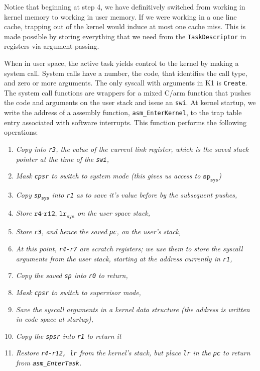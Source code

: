 \documentclass{article}
\begin{document}
Notice that beginning at step 4, we have definitively switched from working in
kernel memory to working in user memory. If we were working in a one line
cache, trapping out of the kernel would induce at most one cache miss. This is
made possible by storing everything that we need from the
\texttt{TaskDescriptor} in registers via argument passing.

When in user space, the active task yields control to the kernel by making a
system call. System calls have a number, the code, that identifies the call
type, and zero or more arguments. The only syscall with arguments in K1 is
\texttt{Create}. The system call functions are wrappers for a mixed C/arm
function that pushes the code and arguments on the user stack and issue an
\texttt{swi}. At kernel startup, we write the address of a assembly function,
\texttt{asm\_EnterKernel}, to the trap table entry associated with software
interrupts. This function performs the following operations:

\begin{enumerate}
	\item \textit{Copy into \texttt{r3}, the value of the current link register,
		which is the saved stack pointer at the time of the \texttt{swi},}
	\item \textit{Mask \texttt{cpsr} to switch to system mode (this gives us
		access to $\texttt{sp}_\texttt{sys}$)}
	\item \textit{Copy \texttt{sp}$_\texttt{sys}$ into \texttt{r1} as to save
		it's value before by the subsequent pushes,}
	\item \textit{Store $\texttt{r4-r12, lr}_\texttt{sys}$ on the user space
		stack,}
	\item \textit{Store \texttt{r3}, and hence the saved \texttt{pc}, on the
		user's stack,}
	\item \textit{At this point, \texttt{r4-r7} are scratch registers; we use
		them to store the syscall arguments from the user stack, starting at the
		address currently in \texttt{r1},}
	\item \textit{Copy the saved \texttt{sp} into \texttt{r0} to return,}
	\item \textit{Mask \texttt{cpsr} to switch to supervisor mode,}
	\item \textit{Save the syscall arguments in a kernel data structure (the
		address is written in code space at startup),}
	\item \textit{Copy the \texttt{spsr} into \texttt{r1} to return it}
	\item \textit{Restore \texttt{r4-r12, lr} from the kernel's stack, but place
		\texttt{lr} in the \texttt{pc} to return from  \texttt{asm\_EnterTask}.}
\end{enumerate}
\end{document}
